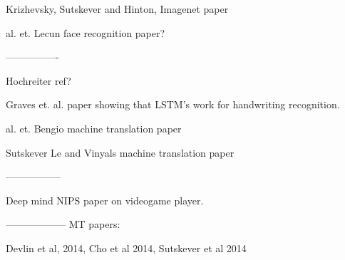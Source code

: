 \documentclass{article} %
\begin{document}
Krizhevsky, Sutskever and Hinton, Imagenet paper


al. et. Lecun face recognition paper?
 
----------------


Hochreiter ref?


Graves et. al. paper showing that LSTM's work for handwriting recognition.


al. et. Bengio machine translation paper


Sutskever Le and Vinyals machine translation paper


-----------------


Deep mind NIPS paper on videogame player.


------------------
MT papers:


Devlin et al, 2014, Cho et al 2014, Sutskever et al 2014



\end{document}
